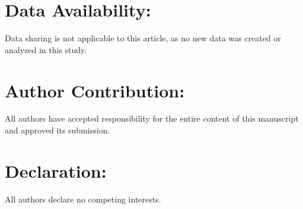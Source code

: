 \documentclass[pdflatex,sn-mathphys-ay]{sn-jnl}
\theoremstyle{thmstyleone}
\theoremstyle{definition}
\theoremstyle{remark}
\begin{document}
\section*{Data Availability:}
Data sharing is not applicable to this article, as no new data was created or analyzed in this study.

\section*{Author Contribution:}

All authors have accepted responsibility for the entire content of this manuscript and approved its submission.


\section*{Declaration:}
All authors declare no competing interests.


\end{document}
